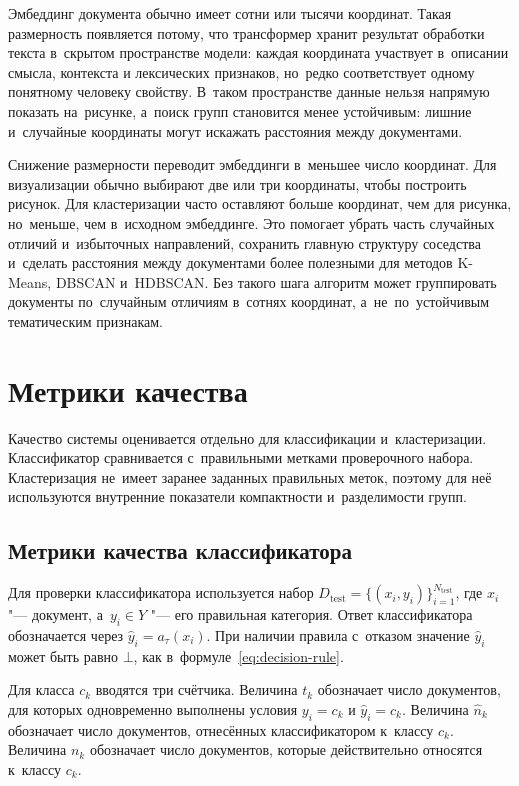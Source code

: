 Эмбеддинг документа обычно имеет сотни или тысячи координат. Такая размерность
появляется потому, что трансформер хранит результат обработки текста в~скрытом
пространстве модели: каждая координата участвует в~описании смысла, контекста и
лексических признаков, но~редко соответствует одному понятному человеку
свойству. В~таком пространстве данные нельзя напрямую показать на~рисунке,
а~поиск групп становится менее устойчивым: лишние и~случайные координаты могут
искажать расстояния между документами.

Снижение размерности переводит эмбеддинги в~меньшее число координат. Для
визуализации обычно выбирают две или три координаты, чтобы построить рисунок.
Для кластеризации часто оставляют больше координат, чем для рисунка, но~меньше,
чем в~исходном эмбеддинге. Это помогает убрать часть случайных отличий
и~избыточных направлений, сохранить главную структуру соседства и~сделать
расстояния между документами более полезными для методов K-Means, DBSCAN
и~HDBSCAN.
Без такого шага алгоритм может группировать документы по~случайным отличиям
в~сотнях координат, а~не~по~устойчивым тематическим признакам.

\section{Метрики качества}\label{sec:ch1/metrics}

Качество системы оценивается отдельно для классификации и~кластеризации.
Классификатор сравнивается с~правильными метками проверочного набора.
Кластеризация не~имеет заранее заданных правильных меток, поэтому для неё
используются внутренние показатели компактности и~разделимости групп.

\subsection{Метрики качества классификатора}\label{subsec:ch1/task/metrics}

Для проверки классификатора используется набор
\( D_{\mathrm{test}} = \{(x_i,y_i)\}_{i=1}^{N_{\mathrm{test}}} \), где
\( x_i \) "--- документ, а~\( y_i \in Y \) "--- его правильная категория. Ответ
классификатора обозначается через \( \hat{y}_i = a_{\tau}(x_i) \). При наличии
правила с~отказом значение \( \hat{y}_i \) может быть равно \( \bot \), как
в~формуле~\eqref{eq:decision-rule}.

Для класса \( c_k \) вводятся три счётчика. Величина \( t_k \) обозначает число
документов, для которых одновременно выполнены условия \( y_i=c_k \) и
\( \hat{y}_i=c_k \). Величина \( \hat{n}_k \) обозначает число документов,
отнесённых классификатором к~классу \( c_k \). Величина \( n_k \) обозначает
число документов, которые действительно относятся к~классу \( c_k \).

